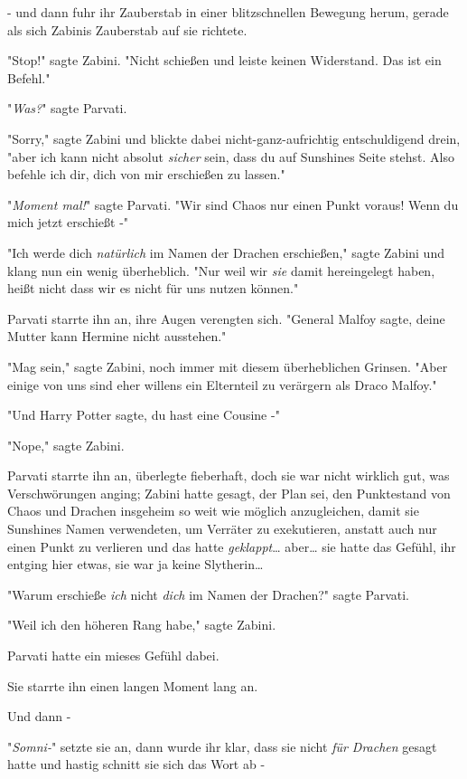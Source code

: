 {- und dann fuhr ihr Zauberstab in einer blitzschnellen Bewegung herum, gerade als sich Zabinis Zauberstab auf sie richtete.

"Stop!" sagte Zabini. "Nicht schießen und leiste keinen Widerstand. Das ist ein Befehl."

"\emph{Was?}" sagte Parvati.

"Sorry," sagte Zabini und blickte dabei nicht-ganz-aufrichtig entschuldigend drein, "aber ich kann nicht absolut \emph{sicher} sein, dass du auf Sunshines Seite stehst. Also befehle ich dir, dich von mir erschießen zu lassen."

"\emph{Moment mal!}" sagte Parvati. "Wir sind Chaos nur einen Punkt voraus! Wenn du mich jetzt erschießt -"

"Ich werde dich \emph{natürlich} im Namen der Drachen erschießen," sagte Zabini und klang nun ein wenig überheblich. "Nur weil wir \emph{sie} damit hereingelegt haben, heißt nicht dass wir es nicht für uns nutzen können."

Parvati starrte ihn an, ihre Augen verengten sich. "General Malfoy sagte, deine Mutter kann Hermine nicht ausstehen."

"Mag sein," sagte Zabini, noch immer mit diesem überheblichen Grinsen. "Aber einige von uns sind eher willens ein Elternteil zu verärgern als Draco Malfoy."

"Und Harry Potter sagte, du hast eine Cousine -"

"Nope," sagte Zabini.

Parvati starrte ihn an, überlegte fieberhaft, doch sie war nicht wirklich gut, was Verschwörungen anging; Zabini hatte gesagt, der Plan sei, den Punktestand von Chaos und Drachen insgeheim so weit wie möglich anzugleichen, damit sie Sunshines Namen verwendeten, um Verräter zu exekutieren, anstatt auch nur einen Punkt zu verlieren und das hatte \emph{geklappt}… aber… sie hatte das Gefühl, ihr entging hier etwas, sie war ja keine Slytherin…

"Warum erschieße \emph{ich} nicht \emph{dich} im Namen der Drachen?" sagte Parvati.

"Weil ich den höheren Rang habe," sagte Zabini.

Parvati hatte ein mieses Gefühl dabei.

Sie starrte ihn einen langen Moment lang an.

Und dann -

"\emph{Somni-}" setzte sie an, dann wurde ihr klar, dass sie nicht \emph{für Drachen} gesagt hatte und hastig schnitt sie sich das Wort ab -

}
